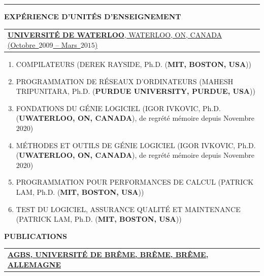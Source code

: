 \documentclass[9pt,a4paper]{article} %
\makeatletter
\newcommand{\headerrow}[2]
{\begin{tabular*}{\linewidth}{l@{\extracolsep{\fill}}r}
	#1 &
	#2 \\
\end{tabular*}}
\newcommand{\headerrowONE}[1]{\headerrow{#1}{}}
\makeatother
\begin{document}
\hrule
\begin{center}
{\large \textbf{EXPÉRIENCE D'UNITÉS D'ENSEIGNEMENT}}
\end{center}

\vspace{0.5em}

\headerrowONE{\href{http://ece.uwaterloo.ca}{\textbf{UNIVERSITÉ DE WATERLOO}, WATERLOO, ON, CANADA (Octobre~$2009$ -- Mars~$2015$)}}

\begin{enumerate}
	\itemsep -0.3em
	\item COMPILATEURS (DEREK RAYSIDE, Ph.D. (\textbf{MIT, BOSTON, USA}))
	\item PROGRAMMATION DE RÉSEAUX D'ORDINATEURS (MAHESH TRIPUNITARA, Ph.D. (\textbf{PURDUE UNIVERSITY, PURDUE, USA}))
	\item FONDATIONS DU GÉNIE LOGICIEL (IGOR IVKOVIC, Ph.D. (\textbf{UWATERLOO, ON, CANADA}), 
		de regrété mémoire depuis Novembre~$2020$)
	\item MÉTHODES ET OUTILS DE GÉNIE LOGICIEL (IGOR IVKOVIC, Ph.D. (\textbf{UWATERLOO, ON, CANADA}), 
		de regrété mémoire depuis Novembre~$2020$)
	\item PROGRAMMATION POUR PERFORMANCES DE CALCUL (PATRICK LAM, Ph.D. (\textbf{MIT, BOSTON, USA}))
	\item TEST DU LOGICIEL, ASSURANCE QUALITÉ ET MAINTENANCE (PATRICK LAM, Ph.D. (\textbf{MIT, BOSTON, USA}))
\end{enumerate}


\vspace{1em}

\newpage

\begin{center}
{\large \textbf{PUBLICATIONS}}
\end{center}

\vspace{0.5em}


\headerrowONE{\href{http://www.informatik.uni-bremen.de/agbs}{
	\textbf{AGBS, UNIVERSITÉ DE BRÊME, BRÊME, BRÊME, ALLEMAGNE}}}

\vspace{0.3em}
\end{document}
